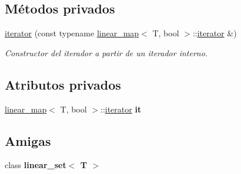 \subsection*{Métodos privados}
\begin{DoxyCompactItemize}
\item 
\hypertarget{classlinear__set_1_1iterator_a6778932b66a53ffd0efc46d26a0710c3}{\hyperlink{classlinear__set_1_1iterator_a6778932b66a53ffd0efc46d26a0710c3}{iterator} (const typename \hyperlink{classlinear__map}{linear\+\_\+map}$<$ T, bool $>$\+::\hyperlink{classlinear__set_1_1iterator}{iterator} \&)}\label{classlinear__set_1_1iterator_a6778932b66a53ffd0efc46d26a0710c3}

\begin{DoxyCompactList}\small\item\em Constructor del iterador a partir de un iterador interno. \end{DoxyCompactList}\end{DoxyCompactItemize}
\subsection*{Atributos privados}
\begin{DoxyCompactItemize}
\item 
\hypertarget{classlinear__set_1_1iterator_ae79df8b590ffcf8cd07a4751f859e882}{\hyperlink{classlinear__map}{linear\+\_\+map}$<$ T, bool $>$\+::\hyperlink{classlinear__set_1_1iterator}{iterator} {\bfseries it}}\label{classlinear__set_1_1iterator_ae79df8b590ffcf8cd07a4751f859e882}

\end{DoxyCompactItemize}
\subsection*{Amigas}
\begin{DoxyCompactItemize}
\item 
\hypertarget{classlinear__set_1_1iterator_a534ce5acb60190eb00d1f44365fa38b5}{class {\bfseries linear\+\_\+set$<$ T $>$}}\label{classlinear__set_1_1iterator_a534ce5acb60190eb00d1f44365fa38b5}

\end{DoxyCompactItemize}


